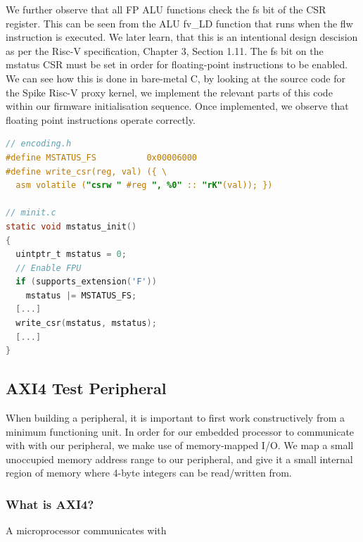 \documentclass[a4paper,8pt]{report}
\begin{document}
We further observe that all FP ALU functions check the fs bit of the CSR register.
This can be seen from the ALU fv\_LD function that runs when the flw instruction
is executed. We later learn, that this is an intentional design descision as per
the Risc-V specification, Chapter 3, Section 1.11. The fs bit on the mstatus CSR must be
set in order for floating-point instructions to be enabled. We can see how this
is done in bare-metal C, by looking at the source code for the Spike Risc-V
proxy kernel, we implement the relevant parts of this code within our firmware
initialisation sequence. Once implemented, we observe that floating point
instructions operate correctly.
\begin{lstlisting}[language=C,style=customc]
// encoding.h
#define MSTATUS_FS          0x00006000
#define write_csr(reg, val) ({ \
  asm volatile ("csrw " #reg ", %0" :: "rK"(val)); })

// minit.c
static void mstatus_init()
{
  uintptr_t mstatus = 0;
  // Enable FPU
  if (supports_extension('F'))
    mstatus |= MSTATUS_FS;
  [...]
  write_csr(mstatus, mstatus);
  [...]
}
\end{lstlisting}


\subsection{AXI4 Test Peripheral}
When building a peripheral, it is important to first work constructively from a
minimum functioning unit. In order for our embedded processor to communicate
with with our peripheral, we make use of memory-mapped I/O. We map a small
unoccupied memory address range to our peripheral, and give it a small internal
region of memory where 4-byte integers can be read/written from.

\subsubsection{What is AXI4?}
A microprocessor communicates with 
\end{document}
